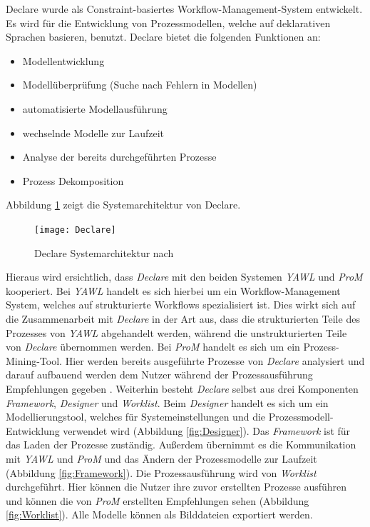 Declare wurde als Constraint-basiertes Workflow-Management-System entwickelt. Es wird für die Entwicklung von Prozessmodellen, welche auf deklarativen Sprachen basieren, benutzt. Declare bietet die folgenden Funktionen an:
\begin {itemize}
\item Modellentwicklung
\item Modellüberprüfung (Suche nach Fehlern in Modellen)
\item automatisierte Modellausführung
\item wechselnde Modelle zur Laufzeit
\item Analyse der bereits durchgeführten Prozesse
\item Prozess Dekomposition
\end {itemize}

Abbildung \ref{fig:Declare} zeigt die Systemarchitektur von Declare.

\begin{figure}[H]
\begin{center}
  \texttt{[image: Declare]} %
  \caption{Declare Systemarchitektur nach \cite{pesic2007declare}}
  \label{fig:Declare}
\end{center}
\end{figure} 

Hieraus wird ersichtlich, dass \textit{Declare} mit den beiden Systemen \textit{YAWL} und \textit{ProM} kooperiert. Bei \textit{YAWL} handelt es sich hierbei um ein Workflow-Management System, welches auf strukturierte Workflows spezialisiert ist. Dies wirkt sich auf die Zusammenarbeit mit \textit{Declare} in der Art aus, dass die strukturierten Teile des Prozesses von \textit{YAWL} abgehandelt werden, während die unstrukturierten Teile von \textit{Declare} übernommen werden. Bei \textit{ProM} handelt es sich um ein Prozess-Mining-Tool. Hier werden bereits ausgeführte Prozesse von \textit{Declare} analysiert und darauf aufbauend werden dem Nutzer während der Prozessausführung Empfehlungen gegeben \cite{pesic2007declare}. \newline
Weiterhin besteht \textit{Declare} selbst aus drei Komponenten \textit{Framework}, \textit{Designer} und \textit{Worklist}.  Beim \textit{Designer} handelt es sich um ein Modellierungstool, welches für Systemeinstellungen und die Prozessmodell-Entwicklung verwendet wird (Abbildung \ref{fig:Designer}). Das \textit{Framework} ist für das Laden der Prozesse zuständig. Außerdem übernimmt es die Kommunikation mit \textit{YAWL} und \textit{ProM} und das Ändern der Prozessmodelle zur Laufzeit (Abbildung \ref{fig:Framework}). Die Prozessausführung wird von \textit{Worklist} durchgeführt. Hier können die Nutzer ihre zuvor erstellten Prozesse ausführen und können die von \textit{ProM} erstellten Empfehlungen sehen (Abbildung \ref{fig:Worklist}). Alle Modelle können als Bilddateien exportiert werden.



